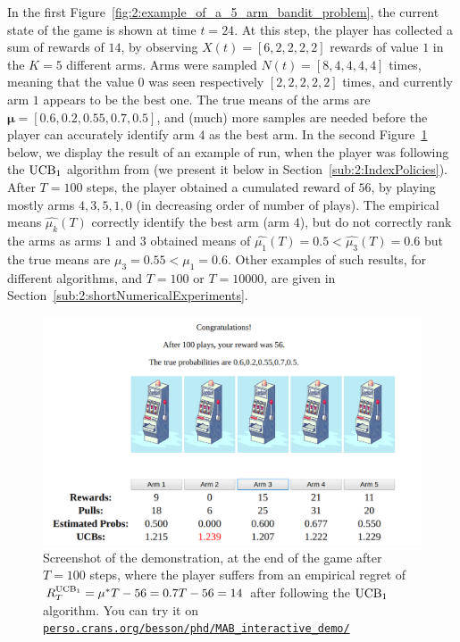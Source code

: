 In the first Figure~\ref{fig:2:example_of_a_5_arm_bandit_problem}, the current state of the game is shown at time $t=24$.
At this step, the player has collected a sum of rewards of $14$, by observing $X(t) = [6,2,2,2,2]$ rewards of value $1$ in the $K=5$ different arms. Arms were sampled $N(t) = [8,4,4,4,4]$ times, meaning that the value $0$ was seen respectively $[2,2,2,2,2]$ times, and currently arm $1$ appears to be the best one. The true means of the arms are $\bm{\mu}=[0.6, 0.2, 0.55, 0.7, 0.5]$, and (much) more samples are needed before the player can accurately identify arm $4$ as the best arm.
%
In the second Figure~\ref{fig:2:example_of_a_5_arm_bandit_problem__step100} below, we display the result of an example of run, when the player was following the $\mathrm{UCB}_1$ algorithm from \cite{Auer02} (we present it below in Section~\ref{sub:2:IndexPolicies}).
After $T=100$ steps, the player obtained a cumulated reward of $56$, by playing mostly arms $4,3,5,1,0$ (in decreasing order of number of plays). The empirical means $\widehat{\mu_k}(T)$ correctly identify the best arm (arm $4$), but do not correctly rank the arms as arms $1$ and $3$ obtained means of $\widehat{\mu_1}(T) = 0.5 < \widehat{\mu_3}(T)=0.6$ but the true means are $\mu_3 = 0.55 < \mu_1 = 0.6$.
Other examples of such results, for different algorithms, and $T=100$ or $T=10000$, are given in Section~\ref{sub:2:shortNumericalExperiments}.

\begin{figure}[h!]  %
    \centering
    \includegraphics[width=0.85\linewidth]{2-Chapters/2-Chapter/Images/example_of_a_5_arm_bandit_problem__step100.png}
    \caption[Screenshot of the demonstration, at the end of the game after $T=100$ steps]{Screenshot of the demonstration, at the end of the game after $T=100$ steps, where the player suffers from an empirical regret of $R^{\mathrm{UCB}_1}_T = \mu^* T - 56 = 0.7 T - 56 = 14$ after following the $\mathrm{UCB}_1$ algorithm.
        You can try it on \href{https://perso.crans.org/besson/phd/MAB\_interactive\_demo/}{\texttt{perso.crans.org/besson/phd/MAB\_interactive\_demo/}}}
    \label{fig:2:example_of_a_5_arm_bandit_problem__step100}
\end{figure}



